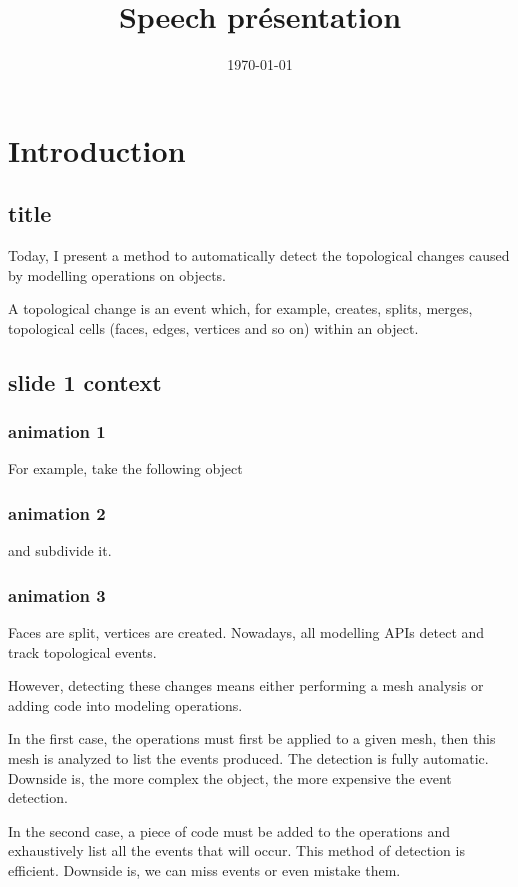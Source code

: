 \documentclass[11pt]{article}
\date{\today}
\title{Speech présentation}
\begin{document}
\maketitle

\section{Introduction}
\label{sec:org29f66d7}

\subsection{title}
\label{sec:org33cef08}
Today, I present a method to automatically detect the topological changes caused
by modelling operations on objects.

A topological change is an event which, for example, creates, splits, merges,
topological cells (faces, edges, vertices and so on) within an object.

\subsection{slide 1 context}
\label{sec:orgfb8ebef}
\subsubsection{animation 1}
\label{sec:org93837d0}
For example, take the following object

\subsubsection{animation 2}
\label{sec:org59f1c84}
and subdivide it.

\subsubsection{animation 3}
\label{sec:org3c15b05}
Faces are split, vertices are created. Nowadays, all modelling APIs detect and
track topological events.

However, detecting these changes means either performing a mesh analysis or
adding code into modeling operations.

In the first case, the operations must first be applied to a given mesh, then
this mesh is analyzed to list the events produced. The detection is fully
automatic. Downside is, the more complex the object, the more expensive the
event detection.

In the second case, a piece of code must be added to the operations and
exhaustively list all the events that will occur. This method of detection is
efficient. Downside is, we can miss events or even mistake them.
\end{document}
